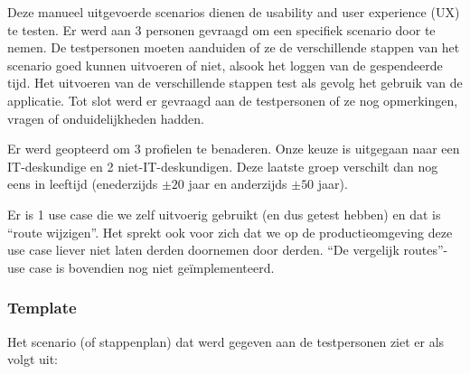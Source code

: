Deze manueel uitgevoerde scenarios dienen de usability and user experience (UX) te testen. Er werd aan 3 personen gevraagd om een specifiek scenario door te nemen. De testpersonen moeten aanduiden of ze de verschillende stappen van het scenario goed kunnen uitvoeren of niet, alsook het loggen van de gespendeerde tijd. Het uitvoeren van de verschillende stappen test als gevolg het gebruik van de applicatie. Tot slot werd er gevraagd aan de testpersonen of ze nog opmerkingen, vragen of onduidelijkheden hadden.

Er werd geopteerd om 3 profielen te benaderen. Onze keuze is uitgegaan naar een IT-deskundige en 2 niet-IT-deskundigen. Deze laatste groep verschilt dan nog eens in leeftijd (enederzijds $\pm 20$ jaar en anderzijds  $\pm 50$ jaar).

Er is 1 use case die we zelf uitvoerig gebruikt (en dus getest hebben) en dat is ``route wijzigen''. Het sprekt ook voor zich dat we op de productieomgeving deze use case liever niet laten derden doornemen door derden. ``De vergelijk routes''-use case is bovendien nog niet geïmplementeerd.




\newpage

\subsubsection{Template}

Het scenario (of stappenplan) dat werd gegeven aan de testpersonen ziet er als volgt uit:

